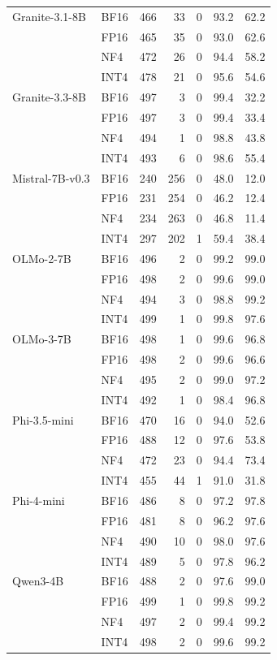\begin{tabular}{@{}l l r r r r r@{}}
\addlinespace
Granite-3.1-8B & BF16 & 466 & 33 & 0 & 93.2 & 62.2 \\
 & FP16 & 465 & 35 & 0 & 93.0 & 62.6 \\
 & NF4 & 472 & 26 & 0 & 94.4 & 58.2 \\
 & INT4 & 478 & 21 & 0 & 95.6 & 54.6 \\
\addlinespace
Granite-3.3-8B & BF16 & 497 & 3 & 0 & 99.4 & 32.2 \\
 & FP16 & 497 & 3 & 0 & 99.4 & 33.4 \\
 & NF4 & 494 & 1 & 0 & 98.8 & 43.8 \\
 & INT4 & 493 & 6 & 0 & 98.6 & 55.4 \\
\addlinespace
Mistral-7B-v0.3 & BF16 & 240 & 256 & 0 & 48.0 & 12.0 \\
 & FP16 & 231 & 254 & 0 & 46.2 & 12.4 \\
 & NF4 & 234 & 263 & 0 & 46.8 & 11.4 \\
 & INT4 & 297 & 202 & 1 & 59.4 & 38.4 \\
\addlinespace
OLMo-2-7B & BF16 & 496 & 2 & 0 & 99.2 & 99.0 \\
 & FP16 & 498 & 2 & 0 & 99.6 & 99.0 \\
 & NF4 & 494 & 3 & 0 & 98.8 & 99.2 \\
 & INT4 & 499 & 1 & 0 & 99.8 & 97.6 \\
\addlinespace
OLMo-3-7B & BF16 & 498 & 1 & 0 & 99.6 & 96.8 \\
 & FP16 & 498 & 2 & 0 & 99.6 & 96.6 \\
 & NF4 & 495 & 2 & 0 & 99.0 & 97.2 \\
 & INT4 & 492 & 1 & 0 & 98.4 & 96.8 \\
\addlinespace
Phi-3.5-mini & BF16 & 470 & 16 & 0 & 94.0 & 52.6 \\
 & FP16 & 488 & 12 & 0 & 97.6 & 53.8 \\
 & NF4 & 472 & 23 & 0 & 94.4 & 73.4 \\
 & INT4 & 455 & 44 & 1 & 91.0 & 31.8 \\
\addlinespace
Phi-4-mini & BF16 & 486 & 8 & 0 & 97.2 & 97.8 \\
 & FP16 & 481 & 8 & 0 & 96.2 & 97.6 \\
 & NF4 & 490 & 10 & 0 & 98.0 & 97.6 \\
 & INT4 & 489 & 5 & 0 & 97.8 & 96.2 \\
\addlinespace
Qwen3-4B & BF16 & 488 & 2 & 0 & 97.6 & 99.0 \\
 & FP16 & 499 & 1 & 0 & 99.8 & 99.2 \\
 & NF4 & 497 & 2 & 0 & 99.4 & 99.2 \\
 & INT4 & 498 & 2 & 0 & 99.6 & 99.2 \\
\bottomrule
\end{tabular}
